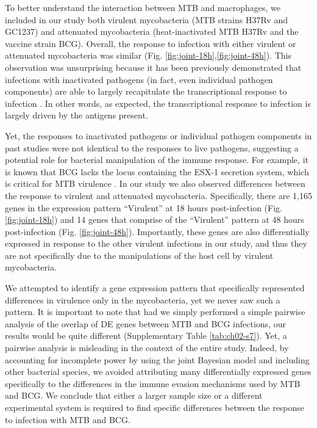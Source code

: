 To better understand the interaction between MTB and macrophages, we
included in our study both virulent mycobacteria (MTB strains H37Rv
and GC1237) and attenuated mycobacteria (heat-inactivated MTB H37Rv
and the vaccine strain BCG). Overall, the response to infection with
either virulent or attenuated mycobacteria was similar
(Fig. \ref{fig:joint-18h},\ref{fig:joint-48h}). This observation was
unsurprising because it has been previously demonstrated that
infections with inactivated pathogens (in fact, even individual
pathogen components) are able to largely recapitulate the
transcriptional response to infection \citep{Huang2001, Boldrick2002,
  Nau2002, Jenner2005}. In other words, as expected, the
transcriptional response to infection is largely driven by the
antigens present.

Yet, the responses to inactivated pathogens or individual pathogen
components in past studies were not identical to the responses to live
pathogens, suggesting a potential role for bacterial manipulation of
the immune response. For example, it is known that BCG lacks the locus
containing the ESX-1 secretion system, which is critical for MTB
virulence \citep{Behr1999, Pym2002, Hsu2003, Simeone2009}. In our
study we also observed differences between the response to virulent
and attenuated mycobacteria. Specifically, there are 1,165 genes in
the expression pattern ``Virulent'' at 18 hours post-infection
(Fig. \ref{fig:joint-18h}) and 14 genes that comprise of the
``Virulent'' pattern at 48 hours post-infection
(Fig. \ref{fig:joint-48h}). Importantly, these genes are also
differentially expressed in response to the other virulent infections
in our study, and thus they are not specifically due to the
manipulations of the host cell by virulent mycobacteria.

We attempted to identify a gene expression pattern that specifically
represented differences in virulence only in the mycobacteria, yet we
never saw such a pattern. It is important to note that had we simply
performed a simple pairwise analysis of the overlap of DE genes
between MTB and BCG infections, our results would be quite different
(Supplementary Table \ref{tab:ch02-s7}). Yet, a pairwise analysis is
misleading in the context of the entire study. Indeed, by accounting
for incomplete power by using the joint Bayesian model and including
other bacterial species, we avoided attributing many differentially
expressed genes specifically to the differences in the immune evasion
mechanisms used by MTB and BCG.  We conclude that either a larger
sample size or a different experimental system is required to find
specific differences between the response to infection with MTB and
BCG.

